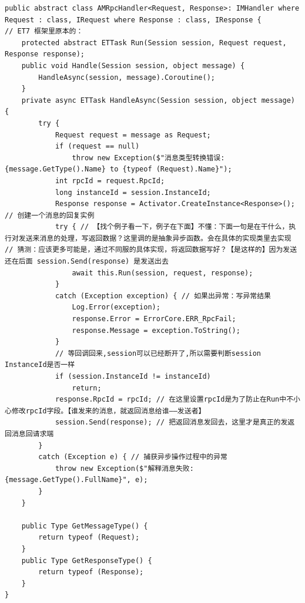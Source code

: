 \documentclass[9pt, b5paper]{article}
\begin{document}
\begin{verbatim}
public abstract class AMRpcHandler<Request, Response>: IMHandler where Request : class, IRequest where Response : class, IResponse {
// ET7 框架里原本的：
    protected abstract ETTask Run(Session session, Request request, Response response);
    public void Handle(Session session, object message) { 
        HandleAsync(session, message).Coroutine();
    }
    private async ETTask HandleAsync(Session session, object message) {
        try {
            Request request = message as Request;
            if (request == null) 
                throw new Exception($"消息类型转换错误: {message.GetType().Name} to {typeof (Request).Name}");
            int rpcId = request.RpcId;
            long instanceId = session.InstanceId;
            Response response = Activator.CreateInstance<Response>(); // 创建一个消息的回复实例
            try { // 【找个例子看一下，例子在下面】不懂：下面一句是在干什么，执行对发送来消息的处理，写返回数据？这里调的是抽象异步函数。会在具体的实现类里去实现
// 猜测：应该更多可能是，通过不同服的具体实现，将返回数据写好？【是这样的】因为发送还在后面 session.Send(response) 是发送出去
                await this.Run(session, request, response); 
            }
            catch (Exception exception) { // 如果出异常：写异常结果
                Log.Error(exception);
                response.Error = ErrorCore.ERR_RpcFail;
                response.Message = exception.ToString();
            }
            // 等回调回来,session可以已经断开了,所以需要判断session InstanceId是否一样
            if (session.InstanceId != instanceId) 
                return;
            response.RpcId = rpcId; // 在这里设置rpcId是为了防止在Run中不小心修改rpcId字段。【谁发来的消息，就返回消息给谁——发送者】
            session.Send(response); // 把返回消息发回去，这里才是真正的发返回消息回请求端
        }
        catch (Exception e) { // 捕获异步操作过程中的异常
            throw new Exception($"解释消息失败: {message.GetType().FullName}", e);
        }
    }

    public Type GetMessageType() {
        return typeof (Request);
    }
    public Type GetResponseType() {
        return typeof (Response);
    }
}    
\end{verbatim}
\end{document}
